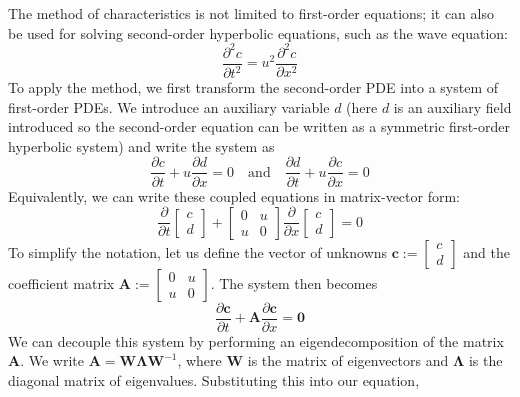 The method of characteristics is not limited to first-order equations; it can also be used for solving second-order hyperbolic equations, such as the wave equation:
\begin{equation}
    \frac{\partial^2 c}{\partial t^2} = u^2 \frac{\partial^2 c}{\partial x^2}
\end{equation}
To apply the method, we first transform the second-order PDE into a system of first-order PDEs. We introduce an auxiliary variable $d$ (here $d$ is an auxiliary field introduced so the second-order equation can be written as a symmetric first-order hyperbolic system) and write the system as
\begin{equation}
    \frac{\partial c}{\partial t} + u \frac{\partial d}{\partial x} = 0 \quad \text{and} \quad \frac{\partial d}{\partial t} + u \frac{\partial c}{\partial x} = 0
\end{equation}
Equivalently, we can write these coupled equations in matrix-vector form:
\begin{equation}
    \frac{\partial}{\partial t} \begin{bmatrix} c \\ d \end{bmatrix} + \begin{bmatrix} 0 & u \\ u & 0 \end{bmatrix} \frac{\partial}{\partial x} \begin{bmatrix} c \\ d \end{bmatrix} = 0
\end{equation}
To simplify the notation, let us define the vector of unknowns $\mathbf{c} := \begin{bmatrix} c \\ d \end{bmatrix}$ and the coefficient matrix $\mathbf{A} := \begin{bmatrix} 0 & u \\ u & 0 \end{bmatrix}$. The system then becomes
\begin{equation}
    \frac{\partial \mathbf{c}}{\partial t} + \mathbf{A} \frac{\partial \mathbf{c}}{\partial x} = \mathbf{0}
\end{equation}
We can decouple this system by performing an eigendecomposition of the matrix $\mathbf{A}$. We write $\mathbf{A} = \mathbf{W}\mathbf{\Lambda}\mathbf{W}^{-1}$, where $\mathbf{W}$ is the matrix of eigenvectors and $\mathbf{\Lambda}$ is the diagonal matrix of eigenvalues. Substituting this into our equation,
